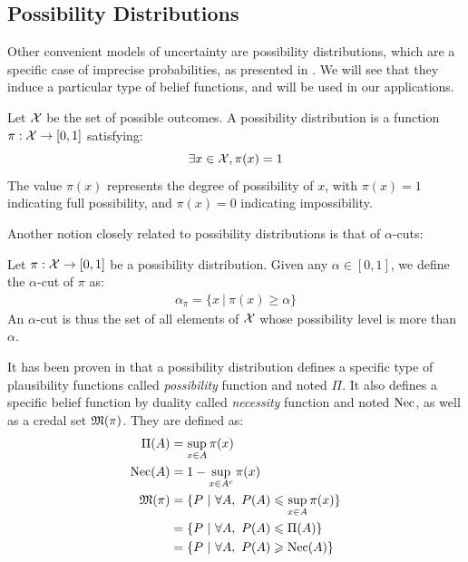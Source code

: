 \subsection{Possibility Distributions}\label{sec:possibilities}
Other convenient models of uncertainty are possibility distributions, which are a specific case of imprecise probabilities, as presented in . We will see that they induce a particular type of belief functions, and will be used in our applications.

\begin{definition}\label{def:possibility}
    Let $\mathcal{X}$ be the set of possible outcomes. A possibility distribution is a function $\pi: \mathcal{X} \rightarrow [0,1]$ satisfying:
    \begin{equation}
    	\exists x \in \mathcal{X}, \pi(x) = 1 \label{eq:possibility}
    \end{equation}
    The value $\pi(x)$ represents the degree of possibility of $x$, with $\pi(x) = 1$ indicating full possibility, and $\pi(x) = 0$ indicating impossibility.
\end{definition}

Another notion closely related to possibility distributions is that of \(\alpha\)-cuts:
\begin{definition}\label{def:alpha_cut}
    Let $\pi: \mathcal{X} \rightarrow [0,1]$ be a possibility distribution. Given any \(\alpha\in[0,1]\), we define the \(\alpha\)-cut of \(\pi\) as:
    \begin{align}
        \alpha_\pi=\{x~|~\pi(x)\geqslant\alpha\} \label{eq:alpha_cut}   
    \end{align}
    An \(\alpha\)-cut is thus the set of all elements of $\mathcal{X}$ whose possibility level is more than $\alpha$.
\end{definition}

\begin{definition}\label{def:possibility_credal_set}
    It has been proven in \cite{dubois_when_1992} that a possibility distribution defines a specific type of plausibility functions called \textit{possibility} function and noted \(\Pi\). It also defines a specific belief function by duality called \textit{necessity} function and noted \(\mathrm{Nec}\), as well as a credal set $\mathfrak{M}(\pi)$. They are defined as:
    \begin{align}
        \Pi(A) &= \sup_{x\in A}\pi(x)\\
        \mathrm{Nec}(A)& =1-\sup_{x\in A^c}\pi(x)\label{eq:bel_pl}\\
        \mathfrak{M}(\pi)& =\{P~|~\forall A,~P(A)\leqslant \sup_{x\in A}\pi(x)\}\\
        &=\{P~|~\forall A,~P(A)\leqslant \Pi(A)\} \label{eq:credal_set_possibility}\\
        &= \{P~|~\forall A,~P(A)\geqslant \mathrm{Nec}(A)\}
\end{align}
\end{definition}

